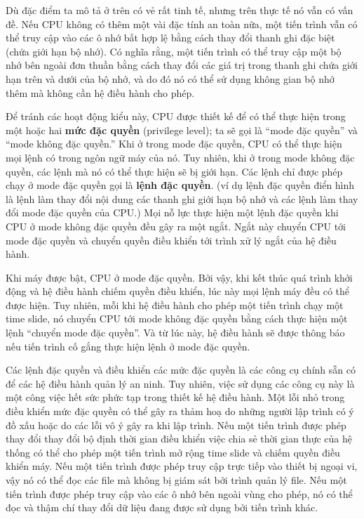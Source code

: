 Dù đặc điểm ta mô tả ở trên có vẻ rất tinh tế, nhưng trên thực tế nó vẫn có vấn đề. Nếu
CPU không có thêm một vài đặc tính an toàn nữa, một tiến trình vẫn có thể truy cập vào các
ô nhớ bất hợp lệ bằng cách thay đổi thanh ghi đặc biệt (chứa giới hạn bộ nhớ). Có nghĩa
rằng, một tiến trình có thể truy cập một bộ nhớ bên ngoài đơn thuần bằng cách thay đổi các
giá trị trong thanh ghi chứa giới hạn trên và dưới của bộ nhớ, và do đó nó có thể sử dụng
không gian bộ nhớ thêm mà không cần hệ điều hành cho phép.

Để tránh các hoạt động kiểu này, CPU được thiết kế để có thể thực hiện trong một hoặc hai
\textbf{mức đặc quyền} (privilege level); ta sẽ gọi là ``mode đặc quyền'' và ``mode
không đặc quyền.'' Khi ở trong mode đặc quyền, CPU có thể thực hiện mọi lệnh có trong ngôn
ngữ máy của nó. Tuy nhiên, khi ở trong mode không đặc quyền, các lệnh mà nó có thể thực
hiện sẽ bị giới hạn. Các lệnh chỉ được phép chạy ở mode đặc quyền gọi là \textbf{lệnh đặc
  quyền}. (ví dụ lệnh đặc quyền điển hình là lệnh làm thay đổi nội dung các thanh ghi giới
hạn bộ nhớ và các lệnh làm thay đổi mode đặc quyền của CPU.) Mọi nỗ lực thực hiện một lệnh
đặc quyền khi CPU ở mode không đặc quyền đều gây ra một ngắt. Ngắt này chuyển CPU tới mode
đặc quyền và chuyển quyền điều khiển tới trình xử lý ngắt của hệ điều hành.

Khi máy được bật, CPU ở mode đặc quyền. Bởi vậy, khi kết thúc quá trình khởi động và hệ
điều hành chiếm quyền điều khiển, lúc này mọi lệnh máy đều có thể được hiện. Tuy nhiên,
mỗi khi hệ điều hành cho phép một tiến trình chạy một time slide, nó chuyển CPU tới mode
không đặc quyền bằng cách thực hiện một lệnh ``chuyển mode đặc quyền''. Và từ lúc này, hệ
điều hành sẽ được thông báo nếu tiến trình cố gắng thực hiện lệnh ở mode đặc quyền.

Các lệnh đặc quyền và điều khiển các mức đặc quyền là các công cụ chính sẵn có để các hệ
điều hành quản lý an ninh. Tuy nhiên, việc sử dụng các công cụ này là một công việc hết
sức phức tạp trong thiết kế hệ điều hành. Một lỗi nhỏ trong điều khiển mức đặc quyền có
thể gây ra thảm hoạ do những người lập trình có ý đồ xấu hoặc do các lỗi vô ý gây ra khi
lập trình. Nếu một tiến trình được phép thay đổi thay đổi bộ định thời gian điều khiển
việc chia sẻ thời gian thực của hệ thống có thể cho phép một tiến trình mở rộng time slide
và chiếm quyền điều khiển máy. Nếu một tiến trình được phép truy cập trực tiếp vào thiết
bị ngoại vi, vậy nó có thể đọc các file mà không bị giám sát bởi trình quản lý file. Nếu
một tiến trình được phép truy cập vào các ô nhớ bên ngoài vùng cho phép, nó có thể đọc và
thậm chí thay đổi dữ liệu đang được sử dụng bởi tiến trình khác.
  
